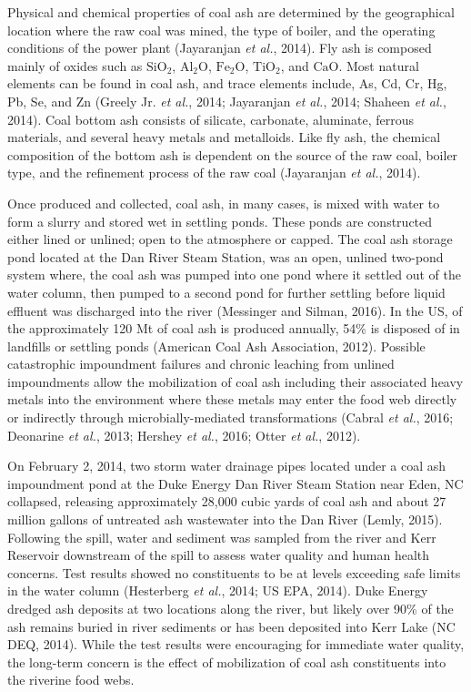 \documentclass[ms, hidelinks]{uncgdissertationexp}
\theoremstyle{plain}
\theoremstyle{definition}
\theoremstyle{remark}
\begin{document}
Physical and chemical properties of coal ash are determined by the geographical location where the raw coal was mined, the type of boiler, and the operating conditions of the power plant (Jayaranjan \emph{et al.}, 2014). Fly ash is composed mainly of oxides such as \(\mathrm{SiO_2}\), \(\mathrm{Al_2O}\), \(\mathrm{Fe_2O}\), \(\mathrm{TiO_2}\), and \(\mathrm{CaO}\). Most natural elements can be found in coal ash, and trace elements include, As, Cd, Cr, Hg, Pb, Se, and Zn (Greely Jr. \emph{et al.}, 2014; Jayaranjan \emph{et al.}, 2014; Shaheen \emph{et al.}, 2014). Coal bottom ash consists of silicate, carbonate, aluminate, ferrous materials, and several heavy metals and metalloids. Like fly ash, the chemical composition of the bottom ash is dependent on the source of the raw coal, boiler type, and the refinement process of the raw coal (Jayaranjan \emph{et al.}, 2014).

Once produced and collected, coal ash, in many cases, is mixed with water to form a slurry and stored wet in settling ponds. These ponds are constructed either lined or unlined; open to the atmosphere or capped. The coal ash storage pond located at the Dan River Steam Station, was an open, unlined two-pond system where, the coal ash was pumped into one pond where it settled out of the water column, then pumped to a second pond for further settling before liquid effluent was discharged into the river (Messinger and Silman, 2016). In the US, of the approximately 120 Mt of coal ash is produced annually, 54\% is disposed of in landfills or settling ponds (American Coal Ash Association, 2012). Possible catastrophic impoundment failures and chronic leaching from unlined impoundments allow the mobilization of coal ash including their associated heavy metals into the environment where these metals may enter the food web directly or indirectly through microbially-mediated transformations (Cabral \emph{et al.}, 2016; Deonarine \emph{et al.}, 2013; Hershey \emph{et al.}, 2016; Otter \emph{et al.}, 2012).

On February 2, 2014, two storm water drainage pipes located under a coal ash impoundment pond at the Duke Energy Dan River Steam Station near Eden, NC collapsed, releasing approximately 28,000 cubic yards of coal ash and about 27 million gallons of untreated ash wastewater into the Dan River (Lemly, 2015). Following the spill, water and sediment was sampled from the river and Kerr Reservoir downstream of the spill to assess water quality and human health concerns. Test results showed no constituents to be at levels exceeding safe limits in the water column (Hesterberg \emph{et al.}, 2014; US EPA, 2014). Duke Energy dredged ash deposits at two locations along the river, but likely over 90\% of the ash remains buried in river sediments or has been deposited into Kerr Lake (NC DEQ, 2014). While the test results were encouraging for immediate water quality, the long-term concern is the effect of mobilization of coal ash constituents into the riverine food webs.
\end{document}
